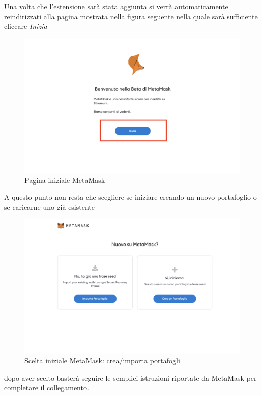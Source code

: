Una volta che l'estensione sarà stata aggiunta si verrà automaticamente reindirizzati alla pagina mostrata nella figura seguente nella quale sarà sufficiente cliccare \textit{Inizia}

\begin{figure}[H]
    \centering
    \includegraphics[scale=0.3]{immagini/MetaMask/startMetamask.png}
    \caption{Pagina iniziale MetaMask}
\end{figure}

A questo punto non resta che scegliere se iniziare creando un nuovo portafoglio o se caricarne uno già esistente 

\begin{figure}[H]
    \centering
    \includegraphics[scale=0.3]{immagini/MetaMask/chooseMetamask.png}
    \caption{Scelta iniziale MetaMask: crea/importa portafogli}
\end{figure}

dopo aver scelto basterà seguire le semplici istruzioni riportate da MetaMask per completare il collegamento.

